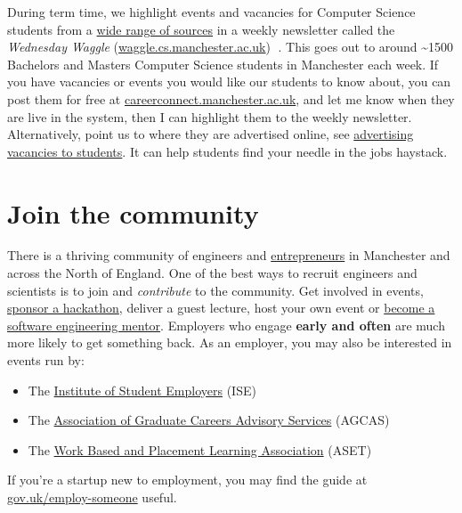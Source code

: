 \documentclass[
  12pt,
]{book}
\providecommand{\tightlist}{%
  \setlength{\itemsep}{0pt}\setlength{\parskip}{0pt}}
\begin{document}
During term time, we highlight events and vacancies for Computer Science students from a \href{http://dullhunk.github.io/where-can-I-look-for-jobs.html}{wide range of sources} in a weekly newsletter called the \emph{Wednesday Waggle} (\href{https://waggle.cs.manchester.ac.uk/waggle/about}{waggle.cs.manchester.ac.uk}) 🐝. This goes out to around \textasciitilde1500 Bachelors and Masters Computer Science students in Manchester each week. If you have vacancies or events you would like our students to know about, you can post them for free at \href{https://careerconnect.manchester.ac.uk/}{careerconnect.manchester.ac.uk}, and let me know when they are live in the system, then I can highlight them to the weekly newsletter. Alternatively, point us to where they are advertised online, see \href{https://www.cdyf.me/finding.html\#studentjobs}{advertising vacancies to students}. It can help students find your needle in the jobs haystack.

\hypertarget{join-the-community}{%
\section{Join the community}\label{join-the-community}}

There is a thriving community of engineers and \href{https://www.manchesterentrepreneurs.co.uk/}{entrepreneurs} in Manchester and across the North of England. One of the best ways to recruit engineers and scientists is to join and \emph{contribute} to the community. Get involved in events, \href{https://www.unicsmcr.com/}{sponsor a hackathon}, deliver a guest lecture, host your own event or \href{https://www.cs.manchester.ac.uk/connect/business-engagement/industrial-mentoring/}{become a software engineering mentor}. Employers who engage \textbf{early and often} are much more likely to get something back. As an employer, you may also be interested in events run by:

\begin{itemize}
\tightlist
\item
  The \href{https://ise.org.uk}{Institute of Student Employers} (ISE)
\item
  The \href{https://www.agcas.org.uk}{Association of Graduate Careers Advisory Services} (AGCAS)
\item
  The \href{https://www.asetonline.org}{Work Based and Placement Learning Association} (ASET)
\end{itemize}

If you're a startup new to employment, you may find the guide at \href{https://www.gov.uk/employ-someone}{gov.uk/employ-someone} useful.
\end{document}
